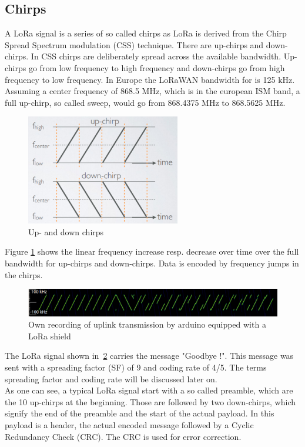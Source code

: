 \subsection{Chirps}
A LoRa signal is a series of so called chirps as LoRa is derived from the Chirp Spread Spectrum modulation (CSS) technique. 
There are up-chirps and down-chirps. In CSS chirps are deliberately spread across the available bandwidth. Up-chirps go from low frequency 
to high frequency and down-chirps go from high frequency to low frequency. In Europe the LoRaWAN bandwidth for is 125 kHz. Assuming a center
frequency of 868.5 MHz, which is in the european ISM band, a full up-chirp, so called sweep, would go from 868.4375 MHz to 868.5625 MHz.

\begin{figure}[h]
    \centering
    \includegraphics[width=0.6\textwidth]{figures/chirp_mobilefish.png}
    \caption{Up- and down chirps~\cite{lora_chirp_mobilefish}}
    \label{fig:chirp_mobilefish}
\end{figure}

Figure \ref{fig:chirp_mobilefish} shows the linear frequency increase resp. decrease over time over the full bandwidth
for up-chirps and down-chirps. Data is encoded by frequency jumps in the chirps. 

\begin{figure}[h]
    \centering
    \includegraphics[width=1\textwidth]{figures/signal_Goodbye!_SF9_CR4_5.png}
    \caption{Own recording of uplink transmission by arduino equipped with a LoRa shield}
    \label{fig:Goodbye}
\end{figure}

The LoRa signal shown in~\ref{fig:Goodbye} carries the message  "Goodbye !". This message was sent 
with a spreading factor (SF) of 9 and coding rate of 4/5. The terms spreading factor and coding rate 
will be discussed later on.\\
As one can see, a typical LoRa signal start with a so called preamble, which are the 10 up-chirps at 
the beginning. Those are followed by two down-chirps, which signify the end of the preamble and the start 
of the actual payload. In this payload is a header, the actual encoded message followed by a Cyclic Redundancy Check (CRC).
The CRC is used for error correction.
